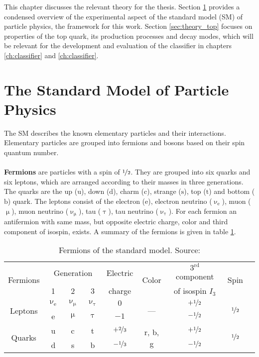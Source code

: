 This chapter discusses the relevant theory for the thesis. Section \ref{sec:theory_sm} provides a condensed overview of the experimental aspect of the standard model (SM) of particle physics, the framework for this work. Section \ref{sec:theory_top} focuses on properties of the top quark, its production processes and decay modes, which will be relevant for the development and evaluation of the classifier in chapters \ref{ch:classifier} and \ref{ch:classifier}.
\section{The Standard Model of Particle Physics}
\label{sec:theory_sm}
The SM describes the known elementary particles and their interactions. Elementary particles are grouped into fermions and bosons based on their spin quantum number.\\ \\
\textbf{Fermions} are particles with a spin of $\nicefrac{1}{2}$. They are grouped into six quarks and six leptons, which are arranged according to their masses in three generations. The quarks are the up ($\textrm{u}$), down ($\textrm{d}$), charm ($\textrm{c}$), strange ($\textrm{s}$), top ($\textrm{t}$) and bottom ($\textrm{b}$) quark. The leptons consist of the electron ($\textrm{e}$), electron neutrino ($\upnu_\textrm{e}$), muon ($\upmu$), muon neutrino ($\upnu_\upmu$), tau ($\uptau$), tau neutrino ($\upnu_\uptau$). For each fermion an antifermion with same mass, but opposite electric charge, color and third component of isospin, exists. A summary of the fermions is given in table \ref{tab:ch_1_sm_fermions}.

\begin{table}[h]
\caption[Fermions of the SM]{Fermions of the standard model. Source: \cite{povh,schenkel}}
\label{tab:ch_1_sm_fermions}
\begin{tabular}{ccccccccc}
\toprule
\multirow{2}{*}{Fermions} & \multicolumn{3}{c}{Generation} & {Electric} & \multirow{2}{*}{Color} & {$3^{\mathrm{rd}}$ component} & \multirow{2}{*}{Spin}\\
& 1 & 2 & 3 & {charge} & & {of isospin $I_3$} & \\
\midrule
\multirow{2}{*}{Leptons} & $\upnu_\textrm{e}$ & $\upnu_\upmu$ & $\upnu_\uptau$ & {$0$} & \multirow{2}{*}{---} & {$+\nicefrac{1}{2}$} & \multirow{2}{*}{$\nicefrac{1}{2}$}\\
& e & $\upmu$ & $\uptau$ & {$-1$} & & {$-\nicefrac{1}{2}$} &\\
\midrule
\multirow{2}{*}{Quarks} & u & c & t & $+\nicefrac{2}{3}$ & \multirow{2}{*}{r, b, g} & {$+\nicefrac{1}{2}$} & \multirow{2}{*}{$\nicefrac{1}{2}$}\\
& d & s & b & $-\nicefrac{1}{3}$ & & {$-\nicefrac{1}{2}$} & \\
\bottomrule
\end{tabular}
\end{table}

